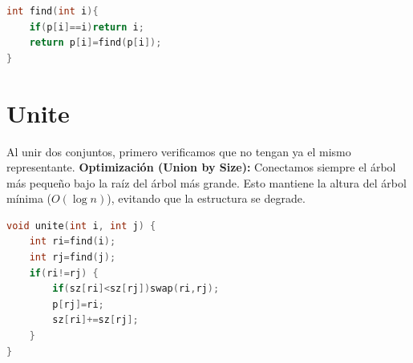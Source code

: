\documentclass{article}
\begin{document}
\begin{lstlisting}[language=c++, caption=Funcion Find con Compresion de Caminos]
int find(int i){
    if(p[i]==i)return i;
    return p[i]=find(p[i]); 
}   
\end{lstlisting}



\section{Unite}
Al unir dos conjuntos, primero verificamos que no tengan ya el mismo representante. 
\textbf{Optimización (Union by Size):} Conectamos siempre el árbol más pequeño bajo la raíz del árbol más grande. Esto mantiene la altura del árbol mínima ($O(\log n)$), evitando que la estructura se degrade.

\begin{lstlisting}[language=c++, caption=Funcion Union por Tamaño]
void unite(int i, int j) {
    int ri=find(i);
    int rj=find(j);
    if(ri!=rj) {
        if(sz[ri]<sz[rj])swap(ri,rj);
        p[rj]=ri;
        sz[ri]+=sz[rj];
    }
}
\end{lstlisting}
\end{document}
